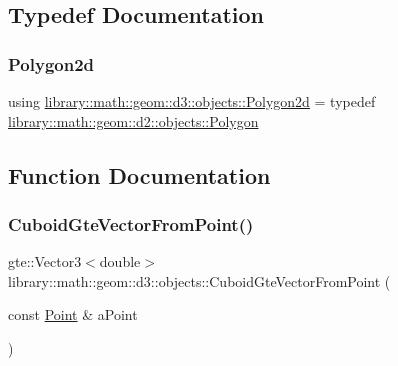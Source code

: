 \subsection{Typedef Documentation}
\mbox{\label{namespacelibrary_1_1math_1_1geom_1_1d3_1_1objects_ae339035ccf9a6f4f0d2945fdcfd76f95}} 
\subsubsection{\texorpdfstring{Polygon2d}{Polygon2d}}
{\footnotesize\ttfamily using \hyperlink{namespacelibrary_1_1math_1_1geom_1_1d3_1_1objects_ae339035ccf9a6f4f0d2945fdcfd76f95}{library\+::math\+::geom\+::d3\+::objects\+::\+Polygon2d} = typedef \hyperlink{classlibrary_1_1math_1_1geom_1_1d2_1_1objects_1_1_polygon}{library\+::math\+::geom\+::d2\+::objects\+::\+Polygon}}



\subsection{Function Documentation}
\mbox{\label{namespacelibrary_1_1math_1_1geom_1_1d3_1_1objects_a96c8edec8956345c9f085ef3073f1b3f}} 
\subsubsection{\texorpdfstring{Cuboid\+Gte\+Vector\+From\+Point()}{CuboidGteVectorFromPoint()}}
{\footnotesize\ttfamily gte\+::\+Vector3$<$double$>$ library\+::math\+::geom\+::d3\+::objects\+::\+Cuboid\+Gte\+Vector\+From\+Point (\begin{DoxyParamCaption}\item[{const \hyperlink{classlibrary_1_1math_1_1geom_1_1d3_1_1objects_1_1_point}{Point} \&}]{a\+Point }\end{DoxyParamCaption})}


